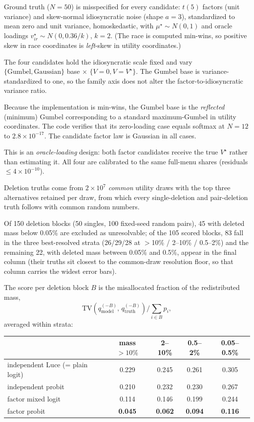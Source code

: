 \documentclass[12pt]{article}
\theoremstyle{remark}
\begin{document}
Ground truth ($N = 50$) is misspecified for every candidate: $t(5)$ factors
(unit variance) and skew-normal idiosyncratic noise (shape $a = 3$),
standardized to mean zero and unit variance, homoskedastic, with $\mu^\star
\sim N(0,1)$ and oracle loadings $v^\star_{ir} \sim N(0, 0.36/k)$, $k=2$.
(The race is computed min-wins, so positive skew in race coordinates is
\emph{left}-skew in utility coordinates.)

The four candidates hold the idiosyncratic scale fixed and vary
$\{\text{Gumbel}, \text{Gaussian}\}$ base $\times$ $\{V = 0, V =
V^\star\}$. The Gumbel base is variance-standardized to one, so the
family axis does not alter the factor-to-idiosyncratic variance ratio.

Because the implementation is min-wins, the Gumbel base is the
\emph{reflected} (minimum) Gumbel corresponding to a standard
maximum-Gumbel in utility coordinates. The code verifies that
its zero-loading case equals softmax at $N=12$ to $2.8\times10^{-17}$.
The candidate factor law is Gaussian in all cases.

This is an \emph{oracle-loading} design: both factor
candidates receive the true $V^\star$ rather than estimating it. All four
are calibrated to the same full-menu shares (residuals $\le
4\times10^{-10}$).

Deletion truths come from $2\times10^7$ \emph{common} utility draws with
the top three alternatives retained per draw, from which every
single-deletion and pair-deletion truth follows with common random numbers.

Of 150 deletion blocks (50 singles, 100 fixed-seed random pairs), 45 with
deleted mass below 0.05\% are excluded as unresolvable; of the 105 scored
blocks, 83 fall in the three best-resolved strata (26/29/28 at $>$10\% /
2--10\% / 0.5--2\%) and the remaining 22, with deleted mass between
0.05\% and 0.5\%, appear in the final column (their truths sit closest to
the common-draw resolution floor, so that column carries the widest error
bars).

The score per deletion block $B$ is the
misallocated fraction of the redistributed mass,
\[
\mathrm{TV}\!\left(q^{(-B)}_{\mathrm{model}},\,
q^{(-B)}_{\mathrm{truth}}\right) \Big/ \textstyle\sum_{i \in B} p_i ,
\]
averaged within strata:

\begin{center}
\begin{tabular}{lcccc}
\toprule
 & mass $>10\%$ & 2--10\% & 0.5--2\% & 0.05--0.5\% \\
\midrule
independent Luce (= plain logit) & 0.229 & 0.245 & 0.261 & 0.305 \\
independent probit & 0.210 & 0.232 & 0.230 & 0.267 \\
factor mixed logit & 0.114 & 0.146 & 0.199 & 0.244 \\
factor probit & \textbf{0.045} & \textbf{0.062} & \textbf{0.094} & \textbf{0.116} \\
\bottomrule
\end{tabular}
\end{center}
\end{document}
